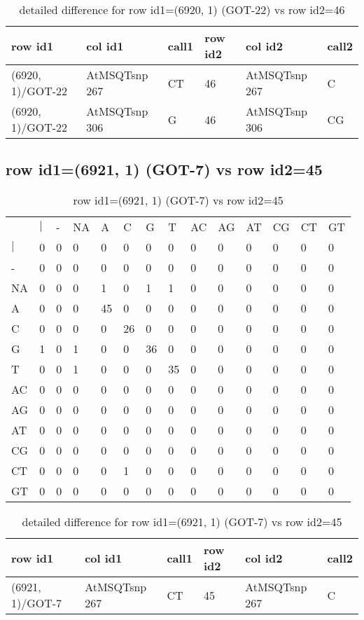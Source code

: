 \begin{center}
\begin{longtable}{|l|l|l|l|l|l|}
\caption{detailed difference for row id1=(6920, 1) (GOT-22) vs row id2=46} \label{table_dm103}\\
\hline
row id1&col id1&call1&row id2&col id2&call2\\
\hline
(6920, 1)/GOT-22&AtMSQTsnp 267&CT&46&AtMSQTsnp 267&C\\
(6920, 1)/GOT-22&AtMSQTsnp 306&G&46&AtMSQTsnp 306&CG\\
\hline
\end{longtable}
\end{center}

\subsection{row id1=(6921, 1) (GOT-7) vs row id2=45}
\begin{center}
\begin{longtable}{|l|l|l|l|l|l|l|l|l|l|l|l|l|l|}
\caption{row id1=(6921, 1) (GOT-7) vs row id2=45} \label{table_dm104}\\
\hline
\\
\hline
&$|$&-&NA&A&C&G&T&AC&AG&AT&CG&CT&GT\\
$|$&0&0&0&0&0&0&0&0&0&0&0&0&0\\
-&0&0&0&0&0&0&0&0&0&0&0&0&0\\
NA&0&0&0&1&0&1&1&0&0&0&0&0&0\\
A&0&0&0&45&0&0&0&0&0&0&0&0&0\\
C&0&0&0&0&26&0&0&0&0&0&0&0&0\\
G&1&0&1&0&0&36&0&0&0&0&0&0&0\\
T&0&0&1&0&0&0&35&0&0&0&0&0&0\\
AC&0&0&0&0&0&0&0&0&0&0&0&0&0\\
AG&0&0&0&0&0&0&0&0&0&0&0&0&0\\
AT&0&0&0&0&0&0&0&0&0&0&0&0&0\\
CG&0&0&0&0&0&0&0&0&0&0&0&0&0\\
CT&0&0&0&0&1&0&0&0&0&0&0&0&0\\
GT&0&0&0&0&0&0&0&0&0&0&0&0&0\\
\hline
\end{longtable}
\end{center}

\begin{center}
\begin{longtable}{|l|l|l|l|l|l|}
\caption{detailed difference for row id1=(6921, 1) (GOT-7) vs row id2=45} \label{table_dm105}\\
\hline
row id1&col id1&call1&row id2&col id2&call2\\
\hline
(6921, 1)/GOT-7&AtMSQTsnp 267&CT&45&AtMSQTsnp 267&C\\
\hline
\end{longtable}
\end{center}

